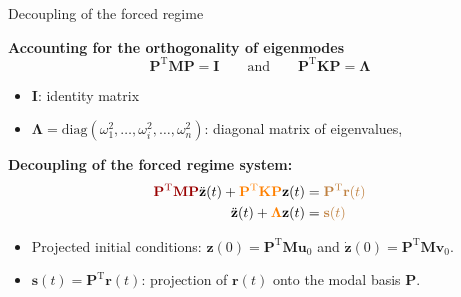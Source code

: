 \documentclass[aspectratio=169]{beamer}
\begin{document}
\begin{frame}{Decoupling of the forced regime}
  \begin{block}{}
    \textbf{Accounting for the orthogonality of eigenmodes}
    \[
      \mathbf{P}^\mathrm{T} \mathbf{M} \mathbf{P} = \mathbf{I}
      \qquad\text{and}\qquad
      \mathbf{P}^\mathrm{T} \mathbf{K} \mathbf{P} = \boldsymbol{\Lambda}
    \]
    \vspace{-0.8cm}
    \begin{itemize}
      \item $\mathbf{I}$: identity matrix
      \item $\boldsymbol{\Lambda}=\mathrm{diag}(\omega_{1}^2, \dots, \omega_{i}^2, \dots, \omega_{n}^2)$: diagonal matrix of eigenvalues,
    \end{itemize}
  \end{block}
  \textbf{Decoupling of the forced regime system:}
  \begin{align*}
    {\color{darkred}\mathbf{P}^\mathrm{T} \mathbf{M} \mathbf{P}} \ddot{\mathbf{z}}(t) +
    {\color{orange}\mathbf{P}^\mathrm{T} \mathbf{K} \mathbf{P}} \mathbf{z}(t) & =
    {\color{brown}\mathbf{P}^\mathrm{T} \mathbf{r}(t)}                                                         \\
    \ddot{\mathbf{z}}(t)+ {\color{orange}\boldsymbol{\Lambda}} \mathbf{z}(t)  & = {\color{brown}\mathbf{s}(t)}
  \end{align*}
  \vspace{-0.5cm}
  \begin{itemize}
    \item Projected initial conditions: $\mathbf{z}(0) = \mathbf{P}^\mathrm{T} \mathbf M\mathbf{u}_0$ and $\dot{\mathbf{z}}(0) = \mathbf{P}^\mathrm{T}\mathbf M\mathbf{v}_0$.
    \item $\mathbf{s}(t)=\mathbf{P}^\mathrm{T} \mathbf{r}(t)$: projection of $\mathbf{r}(t)$ onto the modal basis $\mathbf{P}$.
  \end{itemize}
\end{frame}
\end{document}
